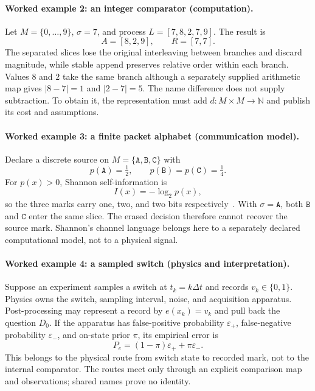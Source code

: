 \paragraph{Worked example 2: an integer comparator (computation).}
Let \(M=\{0,\ldots,9\}\), \(\sigma=7\), and process \(L=[7,8,2,7,9]\).  The result is
\[
 A=[8,2,9],\qquad R=[7,7].
\]
The separated slices lose the original interleaving between branches and discard magnitude, while stable append
preserves relative order within each branch.  Values \(8\) and \(2\) take the same branch although a separately supplied
arithmetic map gives \(|8-7|=1\) and \(|2-7|=5\).  The name difference does not supply subtraction.  To obtain it, the
representation must add \(d:M\times M\to\mathbb N\) and publish its cost and assumptions.

\paragraph{Worked example 3: a finite packet alphabet (communication model).}
Declare a discrete source on \(M=\{\mathtt A,\mathtt B,\mathtt C\}\) with
\[
 p(\mathtt A)=\tfrac12,\qquad p(\mathtt B)=p(\mathtt C)=\tfrac14.
\]
For \(p(x)>0\), Shannon self-information is
\[
 I(x)=-\log_2p(x),
\]
so the three marks carry one, two, and two bits respectively~\cite{shannon1948}.  With
\(\sigma=\mathtt A\), both \(\mathtt B\) and \(\mathtt C\) enter the same slice.  The erased decision therefore cannot
recover the source mark.  Shannon's channel language belongs here to a separately declared computational model, not
to a physical signal.

\paragraph{Worked example 4: a sampled switch (physics and interpretation).}
Suppose an experiment samples a switch at \(t_k=k\Delta t\) and records \(v_k\in\{0,1\}\).  Physics owns the switch,
sampling interval, noise, and acquisition apparatus.  Post-processing may represent a record by \(e(x_k)=v_k\) and
pull back the question \(D_0\).  If the apparatus has false-positive probability \(\varepsilon_+\), false-negative
probability \(\varepsilon_-\), and on-state prior \(\pi\), its empirical error is
\[
 P_e=(1-\pi)\varepsilon_+ + \pi\varepsilon_-.
\]
This belongs to the physical route from switch state to recorded mark, not to the internal comparator.  The routes
meet only through an explicit comparison map and observations; shared names prove no identity.

